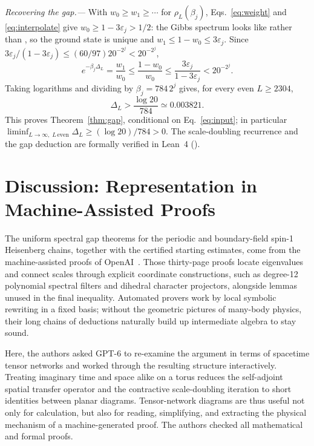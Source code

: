 \documentclass[aps,prl,reprint,amsmath,amssymb,nofootinbib,raggedbottom]{revtex4-2}
\begin{document}
\emph{Recovering the gap.---}
With $w_0\ge w_1\ge\cdots$ for $\rho_L(\beta_j)$, Eqs.~\eqref{eq:weight} and
\eqref{eq:interpolate} give $w_0\ge1-3\varepsilon_j>1/2$: the Gibbs spectrum
looks like  rather than , so the
ground state is unique and $w_1\le 1-w_0\le 3\varepsilon_j$. Since
$3\varepsilon_j/(1-3\varepsilon_j)\le(60/97)20^{-2^j}<20^{-2^j}$,
\begin{equation}
 e^{-\beta_j\Delta_L}=\frac{w_1}{w_0}
 \le\frac{1-w_0}{w_0}
 \le\frac{3\varepsilon_j}{1-3\varepsilon_j}
 <20^{-2^j}.
 \label{eq:gapratio}
\end{equation}
Taking logarithms and dividing by $\beta_j=784\,2^j$ gives, for every
even $L\ge2304$,
\begin{equation}
 \boxed{\Delta_L>\frac{\log20}{784}\simeq0.003821.}
 \label{eq:gap}
\end{equation}
This proves Theorem~\ref{thm:gap}, conditional on Eq.~\eqref{eq:input};
in particular $\liminf_{L\to\infty,\;L\,\mathrm{even}}\Delta_L\ge(\log20)/784>0$.
The scale-doubling recurrence and the gap deduction are formally verified in Lean~4 ().


\section*{Discussion: Representation in Machine-Assisted Proofs}
The uniform spectral gap theorems for the periodic and boundary-field spin-1 Heisenberg chains, together with the certified starting estimates, come from the machine-assisted proofs of OpenAI~\cite{source,boundary}. Those thirty-page proofs locate eigenvalues and connect scales through explicit coordinate constructions, such as degree-12 polynomial spectral filters and dihedral character projectors, alongside lemmas unused in the final inequality. Automated provers work by local symbolic rewriting in a fixed basis; without the geometric pictures of many-body physics, their long chains of deductions naturally build up intermediate algebra to stay sound.

Here, the authors asked GPT-6 to re-examine the argument in terms of spacetime tensor networks and worked through the resulting structure interactively. Treating imaginary time and space alike on a torus reduces the self-adjoint spatial transfer operator and the contractive scale-doubling iteration to short identities between planar diagrams. Tensor-network diagrams are thus useful not only for calculation, but also for reading, simplifying, and extracting the physical mechanism of a machine-generated proof. The authors checked all mathematical and formal proofs.
\end{document}

